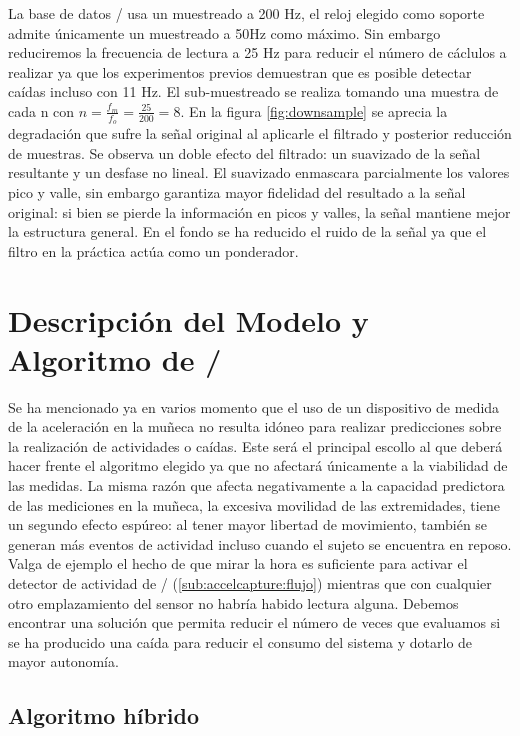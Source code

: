 La base de datos \sisfall/ usa un muestreado a 200 Hz, el reloj elegido como soporte admite únicamente un muestreado a 50Hz como máximo. Sin embargo reduciremos la frecuencia de lectura a 25 Hz para reducir el número de cáclulos a realizar ya que los experimentos previos demuestran que es posible detectar caídas incluso con 11 Hz. El sub-muestreado se realiza tomando una muestra de cada n con $n=\frac{f_m}{f_o}=\frac{25}{200}=8$. En la figura \ref{fig:downsample} se aprecia la degradación que sufre la señal original al aplicarle el filtrado y posterior reducción de muestras. Se observa un doble efecto del filtrado: un suavizado de la señal resultante y un desfase no lineal. El suavizado enmascara parcialmente los valores pico y valle, sin embargo garantiza mayor fidelidad del resultado a la señal original: si bien se pierde la información en picos y valles, la señal mantiene mejor la estructura general. En el fondo se ha reducido el ruido de la señal ya que el filtro en la práctica actúa como un ponderador.


\section{Descripción del Modelo y Algoritmo de \ifell/}\label{sec:imp:model}

Se ha mencionado ya en varios momento que el uso de un dispositivo de medida de la aceleración en la muñeca no resulta idóneo para realizar predicciones sobre la realización de actividades o caídas. Este será el principal escollo al que deberá hacer frente el algoritmo elegido ya que no afectará únicamente a la viabilidad de las medidas. La misma razón que afecta negativamente a la capacidad predictora de las mediciones en la muñeca, la excesiva movilidad de las extremidades, tiene un segundo efecto espúreo: al tener mayor libertad de movimiento, también se generan más eventos de actividad incluso cuando el sujeto se encuentra en reposo. Valga de ejemplo el hecho de que mirar la hora es suficiente para activar el detector de actividad de \accelcapture/ (\autoref{sub:accelcapture:flujo}) mientras que con cualquier otro emplazamiento del sensor no habría habido lectura alguna. Debemos encontrar una solución que permita reducir el número de veces que evaluamos si se ha producido una caída para reducir el consumo del sistema y dotarlo de mayor autonomía.

\subsection{Algoritmo híbrido}\label{sub:imp:model:algoritmo}


